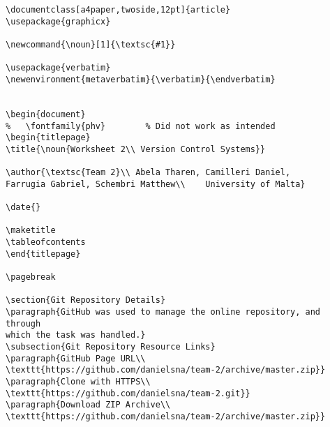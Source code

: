 \documentclass[a4paper,twoside,12pt]{article}
\newcommand{\noun}[1]{\textsc{#1}}
\begin{document}
\begin{verbatim}
\documentclass[a4paper,twoside,12pt]{article}
\usepackage{graphicx}

\newcommand{\noun}[1]{\textsc{#1}}

\usepackage{verbatim}
\newenvironment{metaverbatim}{\verbatim}{\endverbatim}


\begin{document}
%	\fontfamily{phv}		% Did not work as intended
\begin{titlepage}	
\title{\noun{Worksheet 2\\ Version Control Systems}}

\author{\textsc{Team 2}\\ Abela Tharen, Camilleri Daniel, 
Farrugia Gabriel, Schembri Matthew\\	University of Malta}

\date{}

\maketitle
\tableofcontents
\end{titlepage}	

\pagebreak

\section{Git Repository Details}
\paragraph{GitHub was used to manage the online repository, and through 
which the task was handled.}
\subsection{Git Repository Resource Links}
\paragraph{GitHub Page URL\\ 
\texttt{https://github.com/danielsna/team-2/archive/master.zip}}
\paragraph{Clone with HTTPS\\ 
\texttt{https://github.com/danielsna/team-2.git}}
\paragraph{Download ZIP Archive\\ 
\texttt{https://github.com/danielsna/team-2/archive/master.zip}}


\end{verbatim}
\end{document}
